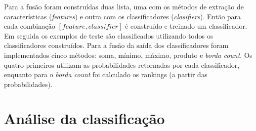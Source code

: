 \documentclass[paper=a4, fontsize=11pt]{scrartcl} %
\numberwithin{equation}{section} %
\numberwithin{figure}{section} %
\numberwithin{table}{section} %
\begin{document}
Para a fusão foram construídas duas lista, uma com os métodos de extração de características ({\it features}) e outra com os classificadores ({\it clasifiers}).
Então para cada combinação $[feature, classifier]$ é construído e treinado um classificador.
Em seguida os exemplos de teste são classificados utilizando todos os classificadores construídos.
Para a fusão da saída dos classificadores foram implementados cinco métodos: soma, mínimo, máximo, produto e {\it borda count}.
Os quatro primeiros utilizam as probabilidades retornadas por cada classificador, 
enquanto para o {\it borda count} foi calculado os rankings (a partir das probabilidades).

\section {Análise da classificação}
\end{document}
